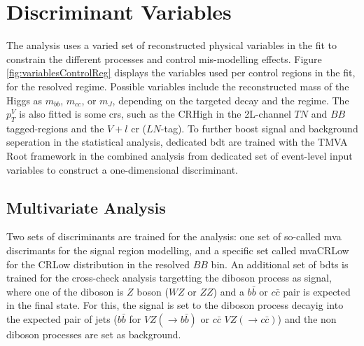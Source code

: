 \section{Discriminant Variables}\label{sec-vh-disc}
The analysis uses a varied set of reconstructed physical variables in the fit to constrain the different processes and control mis-modelling effects. Figure \ref{fig:variablesControlReg} displays the variables used per control regions in the fit, for the resolved regime. Possible variables include the reconstructed mass of the Higgs as $m_{bb}$, $m_{cc}$, or $m_J$, depending on the targeted decay and the regime. The $p_T^V$ is also fitted is some \gls{cr}s, such as the CRHigh in the 2L-channel $TN$ and $BB$ tagged-regions and the $V+l$ \gls{cr} ($LN$-tag). To further boost signal and background seperation in the statistical analysis, dedicated \gls{bdt} are trained with the \textsc{TMVA} Root framework \cite{Therhaag:2011jh} in the combined analysis from dedicated set of event-level input variables to construct a one-dimensional discriminant. \\

\subsection{Multivariate Analysis}
Two sets of discriminants are trained for the analysis: one set of so-called \gls{mva} discrimants for the signal region modelling, and a specific set called mvaCRLow for the CRLow distribution in the resolved $BB$ bin. An additional set of \gls{bdt}s is trained for the cross-check analysis targetting the diboson process as signal, where one of the diboson is $Z$ boson ($WZ$ or $ZZ$) and a $b\bar{b}$ or $c\bar{c}$ pair is expected in the final state. For this, the signal is set to the diboson process decayig into the expected pair of jets ($b\bar{b}$ for $VZ(\rightarrow b\bar{b})$ or $c\bar{c}$ $VZ(\rightarrow c\bar{c})$) and the non diboson processes are set as background.


